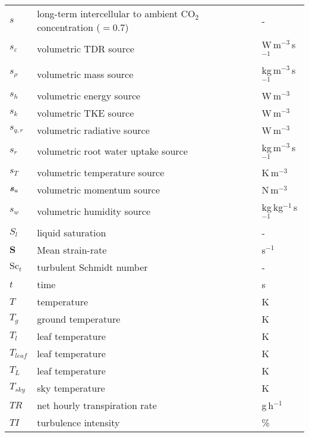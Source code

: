 \begin{longtable}{p{}p{}p{}}
	$s$ & long-term intercellular to ambient CO$_2$ concentration ($=0.7$) & - \\ 
	$s_{\varepsilon}$ & volumetric TDR source & W\,m$^{-3}$\,s$^{-1}$ \\ 		
	$s_{\rho}$ & volumetric mass source & kg\,m$^{-3}$\,s$^{-1}$ \\ 
	$s_h$ & volumetric energy source & W\,m$^{-3}$ \\ 		
	$s_k$ & volumetric TKE source & W\,m$^{-3}$ \\ 		
	$s_{q,r}$ & volumetric radiative source & W\,m$^{-3}$ \\ 		
	$s_r$ & volumetric root water uptake source & kg\,m$^{-3}$\,s$^{-1}$ \\ 	
	$s_T$ & volumetric temperature source & K\,m$^{-3}$ \\ 		
	$\textbf{\textit{s}}_u$ & volumetric momentum source & N\,m$^{-3}$ \\ 	
	$s_w$ & volumetric humidity source & kg\,kg$^{-1}$\,s$^{-1}$ \\ 		
	$S_l$ & liquid saturation & - \\ 
	$\textbf{S}$ & Mean strain-rate &  s$^{-1}$\\ 				
	${\textrm{Sc}_t}$ & turbulent Schmidt number & - \\ 				
	$t$ & time & s \\ 
	$T$ & temperature & K  \\ 
	$T_{\textit{g}}$ & ground temperature & K  \\ 	
	$T_{l}$ & leaf temperature & K  \\ 	
	$T_{leaf}$ & leaf temperature & K  \\ 	
	$T_{L}$ & leaf temperature & K  \\ 	
	$T_{\textit{sky}}$ & sky temperature & K  \\ 		
	$\textit{TR}$ & net hourly transpiration rate & g\,h$^{-1}$  \\ 
	$\textit{TI}$ & turbulence intensity & \%  \\ 		

\end{longtable}
